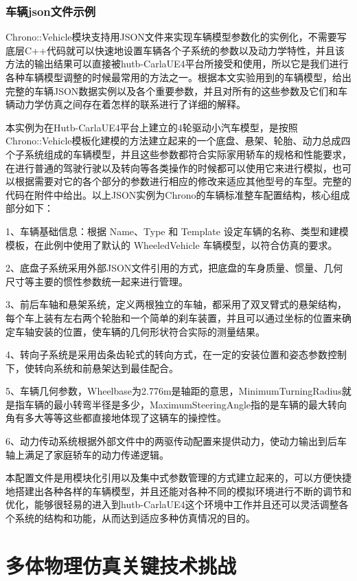 \subsubsection{车辆json文件示例}

Chrono::Vehicle模块支持用JSON文件来实现车辆模型参数化的实例化，不需要写底层C++代码就可以快速地设置车辆各个子系统的参数以及动力学特性，并且该方法的输出结果可以直接被hutb-CarlaUE4平台所接受和使用，所以它是我们进行各种车辆模型调整的时候最常用的方法之一。根据本文实验用到的车辆模型，给出完整的车辆JSON数据实例以及各个重要参数，并且对所有的这些参数及它们和车辆动力学仿真之间存在着怎样的联系进行了详细的解释。

本实例为在Hutb-CarlaUE4平台上建立的4轮驱动小汽车模型，是按照Chrono::Vehicle模板化建模的方法建立起来的一个底盘、悬架、轮胎、动力总成四个子系统组成的车辆模型，并且这些参数都符合实际家用轿车的规格和性能要求，在进行普通的驾驶行驶以及转向等各类操作的时候都可以使用它来进行模拟，也可以根据需要对它的各个部分的参数进行相应的修改来适应其他型号的车型。完整的代码在附件中给出。以上JSON实例为Chrono的车辆标准整车配置结构，核心组成部分如下：

1、车辆基础信息：根据 Name、Type 和 Template 设定车辆的名称、类型和建模模板，在此例中使用了默认的 WheeledVehicle 车辆模型，以符合仿真的要求。

2、底盘子系统采用外部JSON文件引用的方式，把底盘的车身质量、惯量、几何尺寸等主要的惯性参数统一起来进行管理。

3、前后车轴和悬架系统，定义两根独立的车轴，都采用了双叉臂式的悬架结构，每个车上装有左右两个轮胎和一个简单的刹车装置，并且可以通过坐标的位置来确定车轴安装的位置，使车辆的几何形状符合实际的测量结果。

4、转向子系统是采用齿条齿轮式的转向方式，在一定的安装位置和姿态参数控制下，使转向系统和前悬架达到最佳配合。

5、车辆几何参数，Wheelbase为2.776m是轴距的意思，MinimumTurningRadius就是指车辆的最小转弯半径是多少，MaximumSteeringAngle指的是车辆的最大转向角有多大等等这些都直接地体现了这辆车的操控性。

6、动力传动系统根据外部文件中的两驱传动配置来提供动力，使动力输出到后车轴上满足了家庭轿车的动力传递逻辑。

本配置文件是用模块化引用以及集中式参数管理的方式建立起来的，可以方便快捷地搭建出各种各样的车辆模型，并且还能对各种不同的模拟环境进行不断的调节和优化，能够很轻易的进入到hutb-CarlaUE4这个环境中工作并且还可以灵活调整各个系统的结构和功能，从而达到适应多种仿真情况的目的。
\section{多体物理仿真关键技术挑战}

